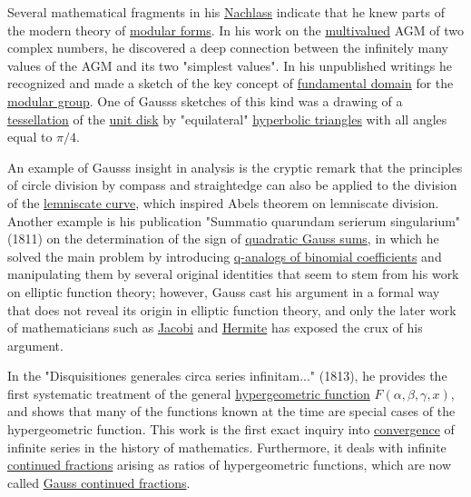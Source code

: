 Several mathematical fragments in his \href{https://en.wikipedia.org/wiki/Nachlass}{Nachlass} indicate that he knew parts of the modern theory of \href{https://en.wikipedia.org/wiki/Modular_forms}{modular forms}. In his work on the \href{https://en.wikipedia.org/wiki/Multivalued_function}{multivalued} AGM of two complex numbers, he discovered a deep connection between the infinitely many values of the AGM and its two "simplest values". In his unpublished writings he recognized and made a sketch of the key concept of \href{https://en.wikipedia.org/wiki/Fundamental_domain}{fundamental domain} for the \href{https://en.wikipedia.org/wiki/Modular_group}{modular group}. One of Gauss\textquotesingle s sketches of this kind was a drawing of a \href{https://en.wikipedia.org/wiki/Tessellation}{tessellation} of the \href{https://en.wikipedia.org/wiki/Unit_disk}{unit disk} by "equilateral" \href{https://en.wikipedia.org/wiki/Hyperbolic_triangle}{hyperbolic triangles} with all angles equal to {{\(\pi/4\)}{}}.

An example of Gauss\textquotesingle s insight in analysis is the cryptic remark that the principles of circle division by compass and straightedge can also be applied to the division of the \href{https://en.wikipedia.org/wiki/Lemniscate_curve}{lemniscate curve}, which inspired Abel\textquotesingle s theorem on lemniscate division. Another example is his publication "Summatio quarundam serierum singularium" (1811) on the determination of the sign of \href{https://en.wikipedia.org/wiki/Quadratic_Gauss_sums?action=edit&redlink=1}{quadratic Gauss sums}, in which he solved the main problem by introducing \href{https://en.wikipedia.org/wiki/Gaussian_binomial_coefficient}{q-analogs of binomial coefficients} and manipulating them by several original identities that seem to stem from his work on elliptic function theory; however, Gauss cast his argument in a formal way that does not reveal its origin in elliptic function theory, and only the later work of mathematicians such as \href{https://en.wikipedia.org/wiki/Carl_Gustav_Jacob_Jacobi}{Jacobi} and \href{https://en.wikipedia.org/wiki/Hermite}{Hermite} has exposed the crux of his argument.

In the "Disquisitiones generales circa series infinitam..." (1813), he provides the first systematic treatment of the general \href{https://en.wikipedia.org/wiki/Hypergeometric_function}{hypergeometric function} {{\(F(\alpha,\beta,\gamma,x)\)}{}}, and shows that many of the functions known at the time are special cases of the hypergeometric function. This work is the first exact inquiry into \href{https://en.wikipedia.org/wiki/Convergent_series}{convergence} of infinite series in the history of mathematics. Furthermore, it deals with infinite \href{https://en.wikipedia.org/wiki/Continued_fraction}{continued fractions} arising as ratios of hypergeometric functions, which are now called \href{https://en.wikipedia.org/wiki/Gauss_continued_fraction}{Gauss continued fractions}.

